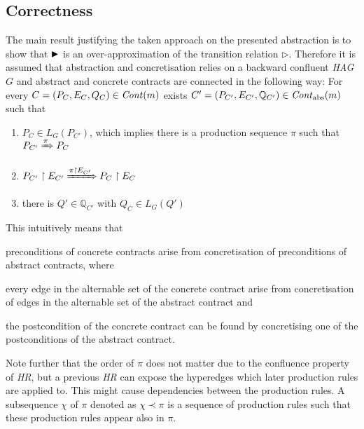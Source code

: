 	\subsection{Correctness}
	The main result justifying the taken approach on the presented abstraction
	is to show that $\blacktriangleright$ is an over-approximation of the transition relation
	$\rhd$. Therefore it is assumed that abstraction and concretisation relies
	on a backward confluent \emph{\ac{HAG}} $G$ and abstract and concrete
	contracts are connected in the following way: For every
	$C = (P_{C}, E_{C}, Q_{C})\in\mathit{Cont}(m)$ exists
	$C' = (P_{C'}, E_{C'}, \mathbb{Q}_{C'})\in\mathit{Cont}_{\text{abs}}(m)$ such that
	\begin{enumerate}[label=(\roman*)]
		\item $P_{C}\in L_{G}(P_{C'})$, which implies there is a production
			sequence $\pi$ such that $P_{C'}\xRightarrow{\pi}P_{C}$
		\item  $P_{C'}\upharpoonright E_{C'}
			\xRightarrow{\pi\upharpoonright E_{C'}}P_{C}\upharpoonright E_{C}$
		\item there is $Q'\in\mathbb{Q}_{C'}$ with $Q_{C}\in L_{G}(Q')$
	\end{enumerate}
	This intuitively means that
	\begin{enumerate*}[label=(\roman*)]
		\item preconditions of concrete contracts arise from concretisation of 
			preconditions of abstract contracts, where
		\item every edge in the alternable set of the concrete contract arise
			from concretisation of edges in the alternable set of the abstract
			contract and
		\item the postcondition of the concrete contract can be found by
			concretising one of the postconditions of the abstract contract.
	\end{enumerate*}
	Note further that the order of $\pi$ does not matter due to the confluence
	property of \emph{\ac{HR}}, but a previous \emph{\ac{HR}} can expose the
	hyperedges which later production rules are applied to. This might cause
	dependencies between the production rules. A subsequence $\chi$ of
	$\pi$ denoted as $\chi\prec\pi$ is a sequence of production rules such that
	these production rules appear also in $\pi$.

